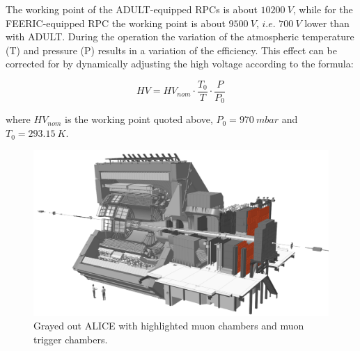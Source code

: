 The working point of the ADULT-equipped RPCs is about $10200\ V$, while for the FEERIC-equipped RPC the working point is about $9500\ V$, $i.e.$ $700\ V$ lower than with ADULT.
During the operation the variation of the atmospheric temperature (T) and pressure (P) results in a variation of the efficiency.
This effect can be corrected for by dynamically adjusting the high voltage according to the formula:

\begin{equation}
\label{eq:HVcorrection}
HV = HV_{nom}\cdot \frac{T_0}{T} \cdot \frac{P}{P_0}
\end{equation}

where $HV_{nom}$ is the working point quoted above, $P_0 = 970\ mbar$ and $T_0 = 293.15\ K$.

\begin{figure}[!t]
\begin{center}
\includegraphics[width=\linewidth]{Chapters/Performance/Figs/ALICEmuon_MTR.pdf}
\caption{Grayed out ALICE with highlighted muon chambers and muon trigger chambers.}
\label{fig:ALICEmuon}
\end{center}
\end{figure}

